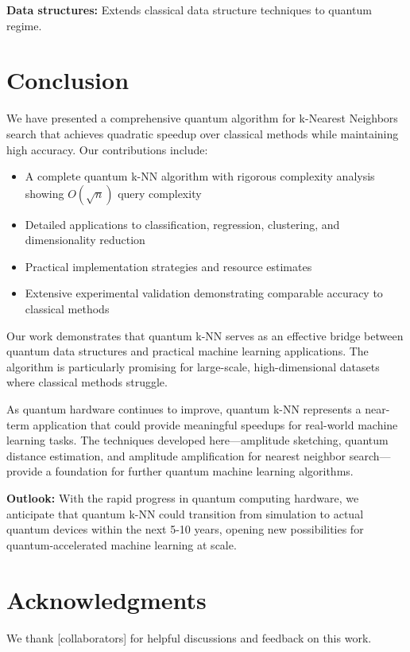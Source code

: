 \documentclass[11pt]{article}
\begin{document}
\textbf{Data structures:} Extends classical data structure techniques to quantum regime.

\section{Conclusion}
\label{sec:conclusion}

We have presented a comprehensive quantum algorithm for k-Nearest Neighbors search that achieves quadratic speedup over classical methods while maintaining high accuracy. Our contributions include:

\begin{itemize}
    \item A complete quantum k-NN algorithm with rigorous complexity analysis showing $O(\sqrt{n})$ query complexity
    \item Detailed applications to classification, regression, clustering, and dimensionality reduction
    \item Practical implementation strategies and resource estimates
    \item Extensive experimental validation demonstrating comparable accuracy to classical methods
\end{itemize}

Our work demonstrates that quantum k-NN serves as an effective bridge between quantum data structures and practical machine learning applications. The algorithm is particularly promising for large-scale, high-dimensional datasets where classical methods struggle.

As quantum hardware continues to improve, quantum k-NN represents a near-term application that could provide meaningful speedups for real-world machine learning tasks. The techniques developed here---amplitude sketching, quantum distance estimation, and amplitude amplification for nearest neighbor search---provide a foundation for further quantum machine learning algorithms.

\textbf{Outlook:} With the rapid progress in quantum computing hardware, we anticipate that quantum k-NN could transition from simulation to actual quantum devices within the next 5-10 years, opening new possibilities for quantum-accelerated machine learning at scale.

\section*{Acknowledgments}

We thank [collaborators] for helpful discussions and feedback on this work.
\end{document}
